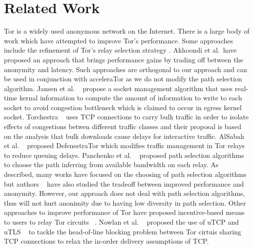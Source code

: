 \section{Related Work}
\label{sec:re-work}
Tor is a widely used anonymous network on the Internet. There is a large body of work which have attempted to improve Tor’s performance. Some approaches include the refinement of Tor’s relay selection strategy \cite{6679287, Sherr10a3:an, Snader08atune-up}. Akhoondi et al.~\cite{6679287}have proposed an approach that brings performance gains by trading off between the anonymity and latency. Such approaches are orthogonal to our approach and can be used in conjunction with acceleraTor as we do not modify the path selection algorithm.
Jansen et al. ~\cite{184431} propose a socket management algorithm that uses real-time kernal information to compute the amount of information to write to each socket to avoid congestion bottleneck which is claimed to occur in egress kernel socket.
Torchestra ~\cite{Gopal:2012:TRI:2381966.2381972} uses TCP connections to carry bulk traffic in order to isolate effects of congestions betwen different traffic classes and their proposal is based on the analysis that bulk downloads cause delays for interactive traffic. 
AlSabah et al. ~\cite{AlSabah:2011:DTO:2032162.2032170} proposed DefenestraTor which modifies traffic management in Tor relays to reduce queuing delays. Panchenko et al. ~\cite{5230652} proposed path selection algorithms to choose the path inferring from available bandwidth on each relay.  
As described, many works have focused on the choosing of path selection algorithms but authors ~\cite{Panchenko:2008:PAA:1371602.1371906} have also studied the tradeoff between improved performance and anonymity. However, our approach does not deal with path selection algorithms, thus will not hurt anonimity due to having low diversity in path selection. Other approaches to improve performance of Tor have proposed  incentive-based means to users to relay Tor circuits ~\cite{Jansen:2010:RNT:1866307.1866344, Jansen_lira:lightweight}. Nowlan et al. ~\cite{179191} proposed the use of uTCP and uTLS ~\cite{180706} to tackle the head-of-line blocking problem between Tor cirtuis sharing TCP connections to relax the in-order delivery assumptions of TCP. 